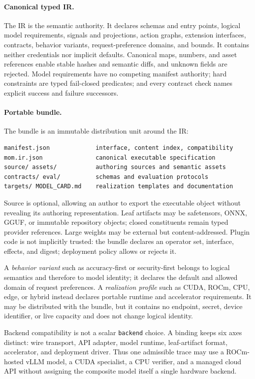 \paragraph{Canonical typed IR.}
The IR is the semantic authority. It declares schemas and entry points, logical
model requirements, signals and projections, action graphs, extension
interfaces, contracts, behavior variants, request-preference domains, and
bounds. It contains neither credentials
nor implicit defaults. Canonical maps, numbers, and asset references enable
stable hashes and semantic diffs, and unknown fields are rejected. Model
requirements have no competing manifest authority; hard constraints are typed
fail-closed predicates; and every contract check names explicit success and
failure successors.

\paragraph{Portable bundle.}
The bundle is an immutable distribution unit around the IR:
\begin{verbatim}
manifest.json             interface, content index, compatibility
mom.ir.json               canonical executable specification
source/ assets/           authoring sources and semantic assets
contracts/ eval/          schemas and evaluation protocols
targets/ MODEL_CARD.md    realization templates and documentation
\end{verbatim}
Source is optional, allowing an author to export the executable object without
revealing its authoring representation. Leaf artifacts may be safetensors,
ONNX, GGUF, or immutable repository objects; closed constituents remain typed
provider references. Large weights may be external but content-addressed.
Plugin code is not implicitly trusted: the bundle declares an operator set,
interface, effects, and digest; deployment policy allows or rejects it.

A \emph{behavior variant} such as accuracy-first or security-first belongs to
logical semantics and therefore to model identity; it declares the default and
allowed domain of request preferences. A \emph{realization profile}
such as CUDA, ROCm, CPU, edge, or hybrid instead declares portable runtime and
accelerator requirements. It may be distributed with the bundle, but it contains
no endpoint, secret, device identifier, or live capacity and does not change
logical identity.

Backend compatibility is not a scalar \texttt{backend} choice. A binding keeps
six axes distinct: wire transport, API adapter, model runtime, leaf-artifact
format, accelerator, and deployment driver. Thus one admissible trace may use a
ROCm-hosted vLLM model, a CUDA specialist, a CPU verifier, and a managed cloud
API without assigning the composite model itself a single hardware backend.

